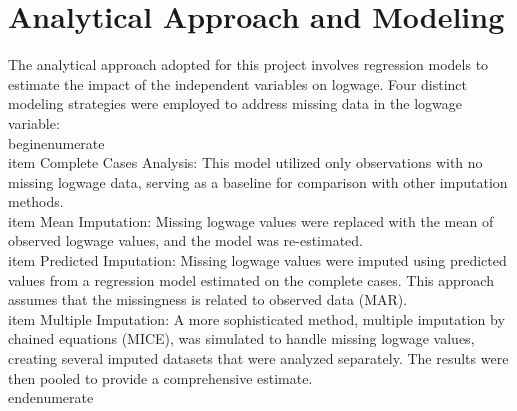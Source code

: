 \documentclass[12pt]{article}
\begin{document}
\begin{table}[h!]
\centering
\caption{Regression Model Coefficients Across Different Imputation Methods}
\end{table}

\section*{Analytical Approach and Modeling}
The analytical approach adopted for this project involves regression models to estimate the impact of the independent variables on logwage. Four distinct modeling strategies were employed to address missing data in the logwage variable:
\\begin{enumerate}
    \\item Complete Cases Analysis: This model utilized only observations with no missing logwage data, serving as a baseline for comparison with other imputation methods.
    \\item Mean Imputation: Missing logwage values were replaced with the mean of observed logwage values, and the model was re-estimated.
    \\item Predicted Imputation: Missing logwage values were imputed using predicted values from a regression model estimated on the complete cases. This approach assumes that the missingness is related to observed data (MAR).
    \\item Multiple Imputation: A more sophisticated method, multiple imputation by chained equations (MICE), was simulated to handle missing logwage values, creating several imputed datasets that were analyzed separately. The results were then pooled to provide a comprehensive estimate.
\\end{enumerate}
\end{document}
